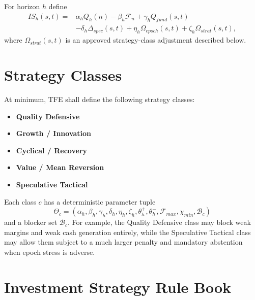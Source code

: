 For horizon $h$ define
\begin{align*}
IS_h(s,t)=&\alpha_h Q_h(n)-\beta_h \mathcal{F}_n+\gamma_h Q_{fund}(s,t)\\
&-\delta_h \Delta_{spec}(s,t)+\eta_h \Omega_{epoch}(s,t)+\zeta_h \Omega_{strat}(s,t),
\end{align*}
where $\Omega_{strat}(s,t)$ is an approved strategy-class adjustment described below.

\section{Strategy Classes}

At minimum, TFE shall define the following strategy classes:
\begin{itemize}
\item \textbf{Quality Defensive}
\item \textbf{Growth / Innovation}
\item \textbf{Cyclical / Recovery}
\item \textbf{Value / Mean Reversion}
\item \textbf{Speculative Tactical}
\end{itemize}

Each class $c$ has a deterministic parameter tuple
\[
\Theta_c=(\alpha_h,\beta_h,\gamma_h,\delta_h,\eta_h,\zeta_h,\theta_h^+,\theta_h^-,\mathcal{F}_{max},\chi_{min},\mathcal{B}_c)
\]
and a blocker set $\mathcal{B}_c$. For example, the Quality Defensive class may block weak margins and weak cash generation entirely, while the Speculative Tactical class may allow them subject to a much larger penalty and mandatory abstention when epoch stress is adverse.


\section{Investment Strategy Rule Book}

